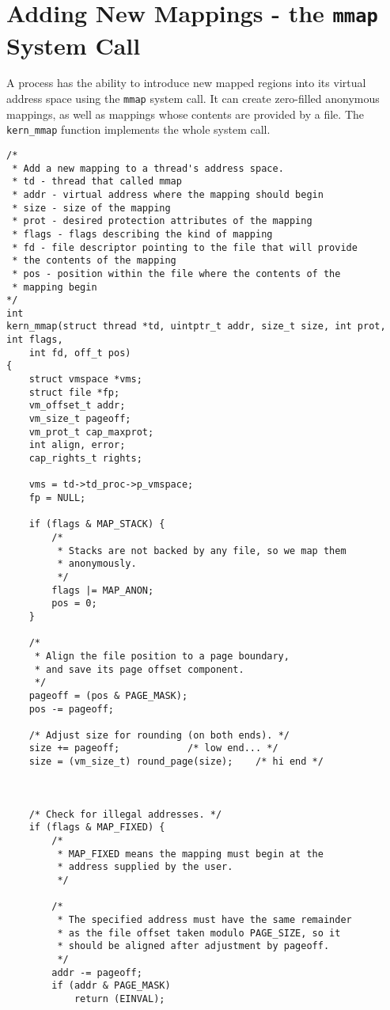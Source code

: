 \documentclass[shortabstract, english]{iithesis}
\newenvironment{code}{}{}
\begin{document}
\section{Adding New Mappings - the \texttt{mmap} System Call}

A process has the ability to introduce new mapped regions into its virtual
address space using the \texttt{mmap} system call. It can create zero-filled
anonymous mappings, as well as mappings whose contents are provided by a file.
The \texttt{kern_mmap} function implements the whole system call.

\vspace{50pt}

\begin{code}
\begin{verbatim}
/*
 * Add a new mapping to a thread's address space.
 * td - thread that called mmap
 * addr - virtual address where the mapping should begin
 * size - size of the mapping
 * prot - desired protection attributes of the mapping
 * flags - flags describing the kind of mapping
 * fd - file descriptor pointing to the file that will provide
 * the contents of the mapping
 * pos - position within the file where the contents of the
 * mapping begin
*/
int
kern_mmap(struct thread *td, uintptr_t addr, size_t size, int prot, int flags,
    int fd, off_t pos)
{
    struct vmspace *vms;
    struct file *fp;
    vm_offset_t addr;
    vm_size_t pageoff;
    vm_prot_t cap_maxprot;
    int align, error;
    cap_rights_t rights;

    vms = td->td_proc->p_vmspace;
    fp = NULL;

    if (flags & MAP_STACK) {
        /*
         * Stacks are not backed by any file, so we map them
         * anonymously.
         */
        flags |= MAP_ANON;
        pos = 0;
    }

    /*
     * Align the file position to a page boundary,
     * and save its page offset component.
     */
    pageoff = (pos & PAGE_MASK);
    pos -= pageoff;

    /* Adjust size for rounding (on both ends). */
    size += pageoff;            /* low end... */
    size = (vm_size_t) round_page(size);    /* hi end */



    /* Check for illegal addresses. */
    if (flags & MAP_FIXED) {
        /*
         * MAP_FIXED means the mapping must begin at the
         * address supplied by the user.
         */

        /*
         * The specified address must have the same remainder
         * as the file offset taken modulo PAGE_SIZE, so it
         * should be aligned after adjustment by pageoff.
         */
        addr -= pageoff;
        if (addr & PAGE_MASK)
            return (EINVAL);


\end{verbatim}
\end{code}
\end{document}
